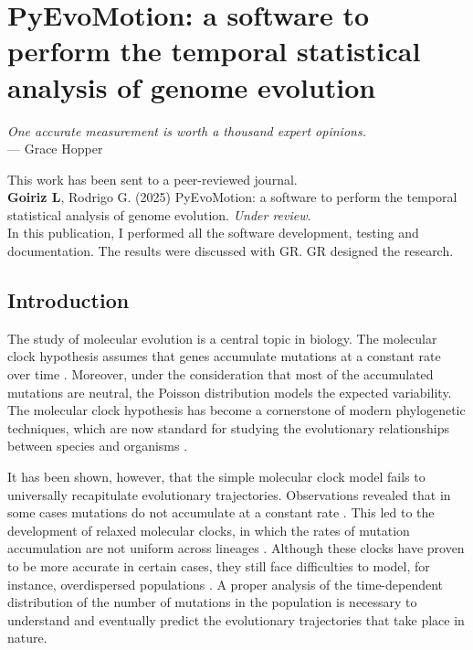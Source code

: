 \chapter{PyEvoMotion: a software to perform the temporal statistical analysis of genome evolution}

\begin{flushright}
    \textit{One accurate measurement is worth a thousand expert opinions.}\\
    --- Grace Hopper
\end{flushright}

\vspace{1cm}

\noindent This work has been sent to a peer-reviewed journal.\\

\noindent \textbf{Goiriz L}, Rodrigo G. (2025) {PyEvoMotion: a software to perform the temporal statistical analysis of genome evolution}. \textit{Under review}.\\

\noindent In this publication, I performed all the software development, testing and documentation. The results were discussed with GR. GR designed the research.

\vfill

\pagebreak

\sloppy

\section{Introduction}

The study of molecular evolution is a central topic in biology. The molecular clock hypothesis assumes that genes accumulate mutations at a constant rate over time \cite{kimura1987}. Moreover, under the consideration that most of the accumulated mutations are neutral, the Poisson distribution models the expected variability. The molecular clock hypothesis has become a cornerstone of modern phylogenetic techniques, which are now standard for studying the evolutionary relationships between species and organisms \cite{kumar2005}.

It has been shown, however, that the simple molecular clock model fails to universally recapitulate evolutionary trajectories. Observations revealed that in some cases mutations do not accumulate at a constant rate \cite{ayala1997}. This led to the development of relaxed molecular clocks, in which the rates of mutation accumulation are not uniform across lineages \cite{drummond2008}. Although these clocks have proven to be more accurate in certain cases, they still face difficulties to model, for instance, overdispersed populations \cite{bedford2008}. A proper analysis of the time-dependent distribution of the number of mutations in the population is necessary to understand and eventually predict the evolutionary trajectories that take place in nature.

